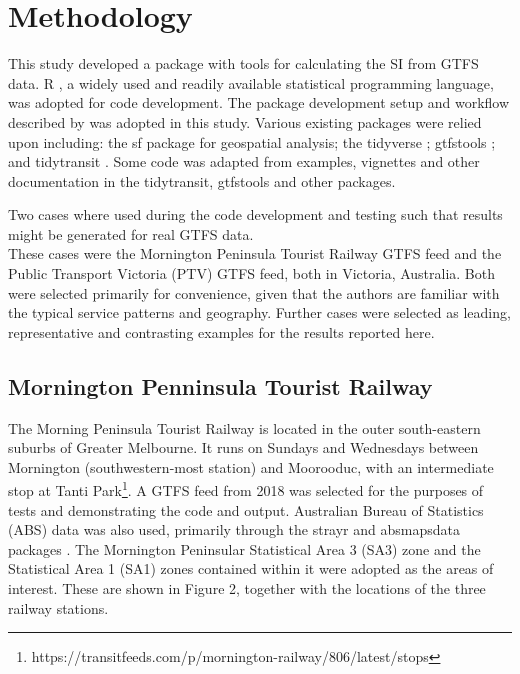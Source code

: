 \documentclass[preprint, 3p,
authoryear]{elsarticle} %
\begin{document}
\hypertarget{methodology}{%
\section{Methodology}\label{methodology}}

This study developed a package with tools for calculating the SI from
GTFS data. R \citep{R-base}, a widely used and readily available
statistical programming language, was adopted for code development. The
package development setup and workflow described by \citet{wickham2023r}
was adopted in this study. Various existing packages were relied upon
including: the sf package \citep{R-sf} for geospatial analysis; the
tidyverse \citep{tidyverse2019}; gtfstools \citep{R-gtfstools}; and
tidytransit \citep{R-tidytransit}. Some code was adapted from examples,
vignettes and other documentation in the tidytransit, gtfstools and
other packages.

Two cases where used during the code development and testing such that
results might be generated for real GTFS data.\\
These cases were the Mornington Peninsula Tourist Railway GTFS feed and
the Public Transport Victoria (PTV) GTFS feed, both in Victoria,
Australia. Both were selected primarily for convenience, given that the
authors are familiar with the typical service patterns and geography.
Further cases were selected as leading, representative and contrasting
examples for the results reported here.

\hypertarget{mornington-penninsula-tourist-railway}{%
\subsection{Mornington Penninsula Tourist
Railway}\label{mornington-penninsula-tourist-railway}}

The Morning Peninsula Tourist Railway is located in the outer
south-eastern suburbs of Greater Melbourne. It runs on Sundays and
Wednesdays between Mornington (southwestern-most station) and Moorooduc,
with an intermediate stop at Tanti Park\footnote{https://transitfeeds.com/p/mornington-railway/806/latest/stops}.
A GTFS feed from 2018 was selected for the purposes of tests and
demonstrating the code and output. Australian Bureau of Statistics (ABS)
data was also used, primarily through the strayr and absmapsdata
packages \citep{r-strayr}. The Mornington Peninsular Statistical Area 3
(SA3) zone and the Statistical Area 1 (SA1) zones contained within it
were adopted as the areas of interest. These are shown in Figure 2,
together with the locations of the three railway stations.
\end{document}
